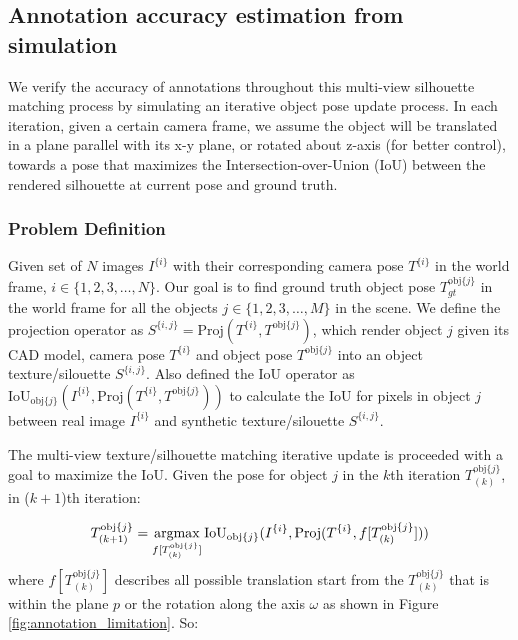 \subsection{Annotation accuracy estimation from simulation}

We verify the accuracy of annotations throughout this multi-view silhouette matching process by simulating an iterative object pose update process. In each iteration, given a certain camera frame, 
we assume the object will be translated in a plane parallel with its x-y plane, or rotated about z-axis (for better control), towards a pose that maximizes the Intersection-over-Union (IoU) between the rendered silhouette at current pose and ground truth.

\subsubsection{Problem Definition} Given set of $N$ images $I^{\{i\}}$ with their corresponding camera pose $T^{\{i\}}$ in the world frame, $i \in \{1, 2, 3, \ldots, N\}$. Our goal is to find ground truth object pose $T^{\text{obj}\{j\}}_{gt}$ in the world frame for all the objects $j \in \{1, 2, 3, \ldots, M\}$ in the scene. We define the projection operator as $S^{\{i, j\}} = \text{Proj}(T^{\{i\}}, T^{\text{obj}\{j\}})$, which render object $j$ given its CAD model, camera pose $T^{\{i\}}$ and object pose $T^{\text{obj}\{j\}}$ into an object texture/silouette $S^{\{i, j\}}$. Also defined the IoU operator as $\text{IoU}_{\text{obj}\{j\}}(I^{\{i\}}, \text{Proj}(T^{\{i\}}, T^{\text{obj}\{j\}}))$ to calculate the IoU for pixels in object $j$ between real image $I^{\{i\}}$ and synthetic texture/silouette $S^{\{i, j\}}$. 


The multi-view texture/silhouette matching iterative update is proceeded with a goal to maximize the IoU. Given the pose for object $j$ in the $k$th iteration $T^{\text{obj}\{j\}}_{(k)}$, in ($k + 1$)th iteration:

\begin{equation}
    T^{\text{obj}\{j\}}_{(k+1)} = \operatorname*{argmax}_{f[T^{\text{obj}\{j\}}_{(k)}]}\text{IoU}_{\text{obj}\{j\}}(I^{\{i\}}, \text{Proj}(T^{\{i\}}, f[T^{\text{obj}\{j\}}_{(k)}] )) 
    \label{eq:iterate}
\end{equation}
where $f[T^{\text{obj}\{j\}}_{(k)}]$ describes all possible translation start from the  $T^{\text{obj}\{j\}}_{(k)}$ 
that is within the plane $p$ or the rotation along the axis $\omega$ as shown in Figure \ref{fig:annotation_limitation}. So:

